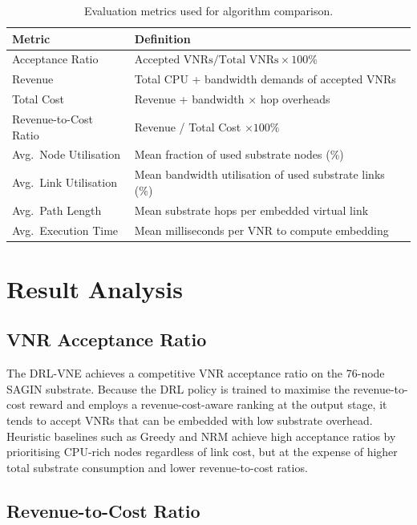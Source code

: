 \documentclass[12pt,a4paper]{report}
\begin{document}
\begin{table}[H]
\centering
\renewcommand{\arraystretch}{1.4}
\begin{tabular}{|l|l|}
\hline
\textbf{Metric} & \textbf{Definition} \\
\hline
Acceptance Ratio     & $\text{Accepted VNRs}/\text{Total VNRs}\times 100\%$ \\
Revenue              & Total CPU + bandwidth demands of accepted VNRs \\
Total Cost           & Revenue + bandwidth $\times$ hop overheads \\
Revenue-to-Cost Ratio & Revenue / Total Cost $\times 100\%$ \\
Avg.\ Node Utilisation & Mean fraction of used substrate nodes (\%) \\
Avg.\ Link Utilisation & Mean bandwidth utilisation of used substrate links (\%) \\
Avg.\ Path Length    & Mean substrate hops per embedded virtual link \\
Avg.\ Execution Time & Mean milliseconds per VNR to compute embedding \\
\hline
\end{tabular}
\caption{Evaluation metrics used for algorithm comparison.}
\label{tab:metrics}
\end{table}

\section{Result Analysis}
\label{sec:result-analysis}

\subsection{VNR Acceptance Ratio}

The DRL-VNE achieves a competitive VNR acceptance ratio on the 76-node SAGIN substrate.
Because the DRL policy is trained to maximise the revenue-to-cost reward and employs a
revenue-cost-aware ranking at the output stage, it tends to accept VNRs that can be embedded
with low substrate overhead. Heuristic baselines such as Greedy and NRM achieve high acceptance
ratios by prioritising CPU-rich nodes regardless of link cost, but at the expense of higher
total substrate consumption and lower revenue-to-cost ratios.

\subsection{Revenue-to-Cost Ratio}
\end{document}
